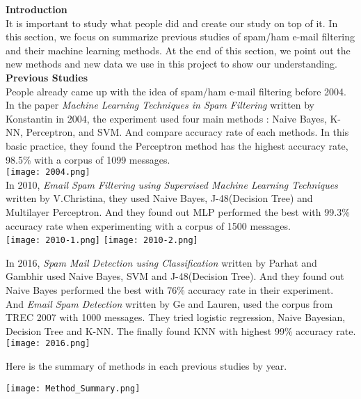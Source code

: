 \textbf{Introduction}\\
It is important to study what people did and create our study on top of it. In this section, we focus on summarize previous studies of spam/ham e-mail filtering and their machine learning methods. At the end of this section, we point out the new methods and new data we use in this project to show our understanding.  \\

\textbf{Previous Studies}\\
People already came up with the idea of spam/ham e-mail filtering before 2004. In the paper \textit{Machine Learning Techniques in Spam Filtering} written by Konstantin in 2004, the experiment used four main methods : Naive Bayes, K-NN, Perceptron, and SVM. And compare accuracy rate of each methods. In this basic practice, they found the Perceptron method has the highest accuracy rate, 98.5\% with a corpus of 1099 messages. \\

\texttt{[image: 2004.png]}\\

In 2010, \textit{Email Spam Filtering using Supervised Machine Learning Techniques } written by V.Christina, they used Naive Bayes, J-48(Decision Tree) and Multilayer Perceptron. And they found out MLP performed the best with 99.3\% accuracy rate when experimenting with a corpus of 1500 messages.\\

\texttt{[image: 2010-1.png]}
\texttt{[image: 2010-2.png]}

In 2016, \textit{Spam Mail Detection using Classification} written by Parhat and Gambhir used Naive Bayes, SVM and J-48(Decision Tree). And they found out Naive Bayes performed the best with 76\% accuracy rate in their experiment. \\ And \textit{Email Spam Detection} written by Ge and  Lauren, used the corpus from TREC 2007 with 1000 messages. They tried logistic regression, Naive Bayesian, Decision Tree and K-NN. The finally found KNN with highest 99\% accuracy rate. \\
\texttt{[image: 2016.png]}

Here is the summary of methods in each previous studies by year. 

\texttt{[image: Method\_Summary.png]}\\


